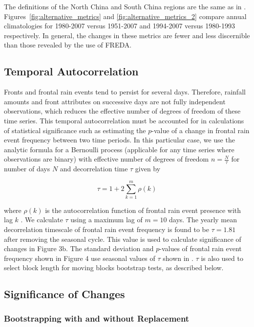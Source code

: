 \documentclass[singlecolumn,11pt]{pnas-new}
\begin{document}
 The definitions of the North China and South China regions are the same as in \cite{Yu2010}. Figures~\ref{fig:alternative_metrics} and \ref{fig:alternative_metrics_2} compare annual climatologies for 1980-2007 versus 1951-2007 and 1994-2007 versus 1980-1993 respectively. In general, the changes in these metrics are fewer and less discernible than those revealed by the use of FREDA.
 
 \subsection{Temporal Autocorrelation}

	Fronts and frontal rain events tend to persist for several days. Therefore, rainfall amounts and front attributes on successive days are not fully independent observations, which reduces the effective number of degrees of freedom of these time series. This temporal autocorrelation must be accounted for in calculations of statistical significance such as estimating the $p$-value of a change in frontal rain event frequency between two time periods. In this particular case, we use the analytic formula for a Bernoulli process (applicable for any time series where observations are binary) with effective number of degrees of freedom $n=\frac{N}{\tau}$ for number of days $N$ and decorrelation time $\tau$ given by

\begin{equation*}
\tau=1+2\sum_{k=1}^m \rho(k)
\end{equation*}

	where $\rho(k)$ is the autocorrelation function of frontal rain event presence with lag $k$ \citep{VonStorch1999}. We calculate $\tau$ using a maximum lag of $m=10$ days. The yearly mean decorrelation timescale of frontal rain event frequency is found to be $\tau = 1.81$ after removing the seasonal cycle. This value is used to calculate significance of changes in Figure 3b. The standard deviation and $p$-values of frontal rain event frequency shown in Figure 4 use seasonal values of $\tau$ shown in \cite{Day2016}. $\tau$ is also used to select block length for moving blocks bootstrap tests, as described below.
 
\subsection{Significance of Changes}

\subsubsection{Bootstrapping with and without Replacement}
\end{document}
